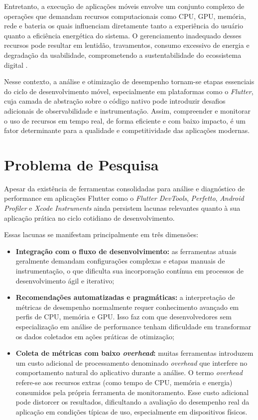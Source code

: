 \documentclass[12pt,a4paper,oneside]{abntex2}
\begin{document}
Entretanto, a execução de aplicações móveis envolve um conjunto complexo de operações que demandam recursos computacionais como CPU, GPU, memória, rede e bateria os quais influenciam diretamente tanto a experiência do usuário quanto a eficiência energética do sistema. O gerenciamento inadequado desses recursos pode resultar em lentidão, travamentos, consumo excessivo de energia e degradação da usabilidade, comprometendo a sustentabilidade do ecossistema digital \cite{cheng2020energy, zhang2021energy}.

Nesse contexto, a análise e otimização de desempenho tornam-se etapas essenciais do ciclo de desenvolvimento móvel, especialmente em plataformas como o \textit{Flutter}, cuja camada de abstração sobre o código nativo pode introduzir desafios adicionais de observabilidade e instrumentação. Assim, compreender e monitorar o uso de recursos em tempo real, de forma eficiente e com baixo impacto, é um fator determinante para a qualidade e competitividade das aplicações modernas.


\section{Problema de Pesquisa}

Apesar da existência de ferramentas consolidadas para análise e diagnóstico de performance em aplicações Flutter como o \textit{Flutter DevTools}, \textit{Perfetto}, \textit{Android Profiler} e \textit{Xcode Instruments} ainda persistem lacunas relevantes quanto à sua aplicação prática no ciclo cotidiano de desenvolvimento.

Essas lacunas se manifestam principalmente em três dimensões:
\begin{itemize}
  \item \textbf{Integração com o fluxo de desenvolvimento:} as ferramentas atuais geralmente demandam configurações complexas e etapas manuais de instrumentação, o que dificulta sua incorporação contínua em processos de desenvolvimento ágil e iterativo;
  
  \item \textbf{Recomendações automatizadas e pragmáticas:} a interpretação de métricas de desempenho normalmente requer conhecimento avançado em perfis de CPU, memória e GPU. Isso faz com que desenvolvedores sem especialização em análise de performance tenham dificuldade em transformar os dados coletados em ações práticas de otimização;
  \item \textbf{Coleta de métricas com baixo \textit{overhead}:} muitas ferramentas introduzem um custo adicional de processamento denominado \textit{overhead} que interfere no comportamento natural do aplicativo durante a análise. O termo \textit{overhead} refere-se aos recursos extras (como tempo de CPU, memória e energia) consumidos pela própria ferramenta de monitoramento. Esse custo adicional pode distorcer os resultados, dificultando a avaliação do desempenho real da aplicação em condições típicas de uso, especialmente em dispositivos físicos.
\end{itemize}
\end{document}
